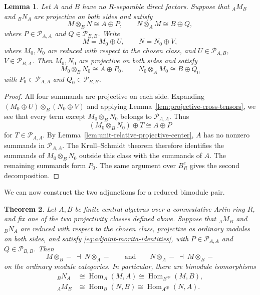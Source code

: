 \documentclass[12pt,a4paper,english,reqno]{amsart}
\numberwithin{equation}{section}
\theoremstyle{plain}
\newtheorem{theorem}{Theorem}[section]
\newtheorem{lemma}[theorem]{Lemma}
\theoremstyle{definition}
\begin{document}
\begin{lemma}
\label{lem:remove-projective-bimodule-summands}
Let $A$ and $B$ have no $R$-separable direct factors.  Suppose that
${}_AM_B$ and ${}_BN_A$ are projective on both sides and
satisfy
\begin{equation}
\label{eq:adjoint-morita-identities}
 M\otimes_BN\cong A\oplus P,
 \qquad N\otimes_AM\cong B\oplus Q,
\end{equation}
where $P\in\mathcal P_{A,A}$ and $Q\in\mathcal P_{B,B}$.  Write
\[
 M=M_0\oplus U,\qquad N=N_0\oplus V,
\]
where $M_0,N_0$ are reduced with respect to the chosen class, and
$U\in\mathcal P_{A,B}$, $V\in\mathcal P_{B,A}$.
Then $M_0,N_0$ are projective on both sides and satisfy
\[
 M_0\otimes_BN_0\cong A\oplus P_0,
 \qquad N_0\otimes_AM_0\cong B\oplus Q_0
\]
with $P_0\in\mathcal P_{A,A}$ and $Q_0\in\mathcal P_{B,B}$.
\end{lemma}

\begin{proof}
All four summands are projective on each side.  Expanding
$(M_0\oplus U)\otimes_B(N_0\oplus V)$ and applying
Lemma~\ref{lem:projective-cross-tensors}, we see that every term except
$M_0\otimes_BN_0$ belongs to $\mathcal P_{A,A}$.  Thus
\[
 (M_0\otimes_BN_0)\oplus T\cong A\oplus P
\]
for $T\in\mathcal P_{A,A}$.  By
Lemma~\ref{lem:unit-relative-projective-center}, $A$ has no nonzero
summands in $\mathcal P_{A,A}$.  The Krull--Schmidt theorem therefore
identifies the summands of $M_0\otimes_BN_0$ outside this class with
the summands of $A$.
The remaining summands form $P_0$.  The same argument over $B^e_R$
gives the second decomposition.
\end{proof}

We can now construct the two adjunctions for a reduced bimodule pair.

\begin{theorem}
\label{thm:adjoint-normalization}
Let $A,B$ be finite central algebras over a commutative Artin ring
$R$, and fix one of the two projectivity classes defined above.
Suppose that ${}_AM_B$ and ${}_BN_A$ are reduced with
respect to the chosen class, projective as ordinary modules on both
sides, and satisfy \eqref{eq:adjoint-morita-identities}, with
$P\in\mathcal P_{A,A}$ and $Q\in\mathcal P_{B,B}$.  Then
\[
 M\otimes_B-\ \dashv\ N\otimes_A-
 \qquad\text{and}\qquad
 N\otimes_A-\ \dashv\ M\otimes_B-
\]
on the ordinary module categories.  In particular, there are bimodule
isomorphisms
\begin{align*}
 {}_BN_A
 &\cong \operatorname{Hom}_A(M,A)
 \cong \operatorname{Hom}_{B^{\mathrm{op}}}(M,B),\\
 {}_AM_B
 &\cong \operatorname{Hom}_B(N,B)
 \cong \operatorname{Hom}_{A^{\mathrm{op}}}(N,A).
\end{align*}
\end{theorem}
\end{document}
